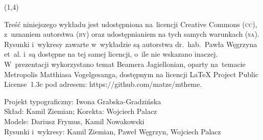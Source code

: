 {\begin{frame}[standout]
\begin{textblock}{4.2}
    \end{textblock}





    \begin{textblock}{11}(1,4)

      \begin{flushleft}

        \mdseries

        \footnotesize

        \RaggedRight

        \color{jFrametitleFGColor}

        Treść niniejszego wykładu jest udostępniona na~licencji
        Creative Commons (\textsc{cc}), z~uzna\-niem autorstwa
        (\textsc{by}) oraz udostępnianiem na tych samych warunkach
        (\textsc{sa}). Rysunki i~wy\-kresy zawarte w~wykładzie są
        autorstwa dr.~hab.~Pawła Węgrzyna et~al. i~są dostępne
        na tej samej licencji, o~ile nie wskazano inaczej.
        W~prezentacji wykorzystano temat Beamera Jagiellonian,
        oparty na~temacie Metropolis Matthiasa Vogelgesanga,
        dostępnym na licencji \LaTeX{} Project Public License~1.3c
        pod adresem: 
        {https://github.com/matze/mtheme}.

        Projekt typograficzny: Iwona Grabska-Gradzińska \\
        Skład: Kamil Ziemian;
        Korekta: Wojciech Palacz \\
        Modele: Dariusz Frymus, Kamil Nowakowski \\
        Rysunki i~wykresy: Kamil Ziemian, Paweł Węgrzyn, Wojciech Palacz

      \end{flushleft}

    \end{textblock}

  \end{frame}





  \begin{frame}[standout]

    \begingroup

    \color{jFrametitleFGColor}

    #1

    \endgroup

  \end{frame}
}



